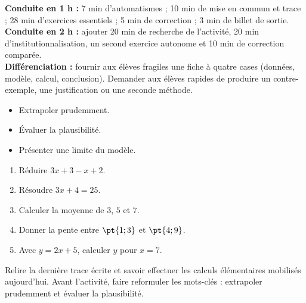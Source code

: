 \ifmxteacher
\begin{method}
\textbf{Conduite en 1 h :} 7 min d'automatismes ; 10 min de mise en commun et trace ; 28 min d'exercices essentiels ; 5 min de correction ; 3 min de billet de sortie.\\
\textbf{Conduite en 2 h :} ajouter 20 min de recherche de l'activité, 20 min d'institutionnalisation, un second exercice autonome et 10 min de correction comparée.\\
\textbf{Différenciation :} fournir aux élèves fragiles une fiche à quatre cases (données, modèle, calcul, conclusion). Demander aux élèves rapides de produire un contre-exemple, une justification ou une seconde méthode.
\end{method}
\fi
{}
\begin{objectives}\begin{itemize}\item Extrapoler prudemment.\item Évaluer la plausibilité.\item Présenter une limite du modèle.\end{itemize}\end{objectives}
\begin{fluency}\begin{enumerate}\item Réduire $3x+3-x+2$. \item Résoudre $3x+4=25$. \item Calculer la moyenne de $3$, $5$ et $7$. \item Donner la pente entre $\pt{1;3}$ et $\pt{4;9}$. \item Avec $y=2x+5$, calculer $y$ pour $x=7$. \end{enumerate}\end{fluency}
\begin{prerequisites}Relire la dernière trace écrite et savoir effectuer les calculs élémentaires mobilisés aujourd'hui. Avant l'activité, faire reformuler les mots-clés : extrapoler prudemment et évaluer la plausibilité.\end{prerequisites}

